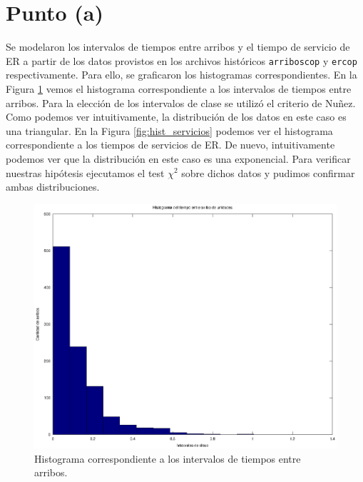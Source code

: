 \documentclass[a4paper,10pt]{article}
\begin{document}


\section{Punto (a)}
Se modelaron los intervalos de tiempos entre arribos y el tiempo de servicio de ER a partir de los datos provistos en los archivos históricos \verb|arriboscop| y \verb|ercop| respectivamente. Para ello, se graficaron los histogramas correspondientes. En la Figura \ref{fig:hist_arriboscop} vemos el histograma correspondiente a los intervalos de tiempos entre arribos. Para la elección de los intervalos de clase se utilizó el criterio de Nuñez. Como podemos ver intuitivamente, la distribución de los datos en este caso es una triangular. En la Figura \ref{fig:hist_servicios} podemos ver el histograma correspondiente a los tiempos de servicios de ER. De nuevo, intuitivamente podemos ver que la distribución en este caso es una exponencial. Para verificar nuestras hipótesis ejecutamos el test $\chi^2$ sobre dichos datos y pudimos confirmar ambas distribuciones.

\begin{figure}[h]
\begin{center}
\includegraphics[width=15cm]{../src/parteA/hist_arribos.eps}
\caption{\label{fig:hist_arriboscop} Histograma correspondiente a los intervalos de tiempos entre arribos.}
\end{center}
\end{figure}
\end{document}
